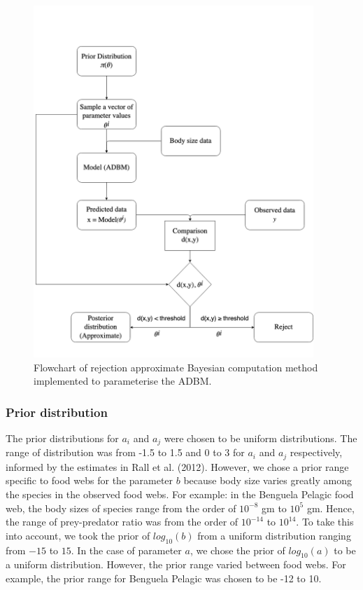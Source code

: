 \documentclass{article}
\begin{document}
\begin{figure}

{\centering \includegraphics[width=400px]{fig/schematic} 

}

\caption{\label{fig:fig_m1} Flowchart of rejection approximate Bayesian computation method implemented to parameterise the ADBM.}\label{fig:unnamed-chunk-3}
\end{figure}

\hypertarget{prior-distribution}{%
\subsubsection{Prior distribution}\label{prior-distribution}}

The prior distributions for \(a_i\) and \(a_j\) were chosen to be
uniform distributions. The range of distribution was from -1.5 to 1.5
and 0 to 3 for \(a_i\) and \(a_j\) respectively, informed by the
estimates in Rall et al. (2012). However, we chose a prior range
specific to food webs for the parameter \(b\) because body size varies
greatly among the species in the observed food webs. For example: in the
Benguela Pelagic food web, the body sizes of species range from the
order of \(10^{-8}\) gm to \(10^5\) gm. Hence, the range of
prey-predator ratio was from the order of \(10^{-14}\) to \(10^{14}\).
To take this into account, we took the prior of \(log_{10}(b)\) from a
uniform distribution ranging from \(-15\) to \(15\). In the case of
parameter \(a\), we chose the prior of \(log_{10}(a)\) to be a uniform
distribution. However, the prior range varied between food webs. For
example, the prior range for Benguela Pelagic was chosen to be -12 to
10.
\end{document}
